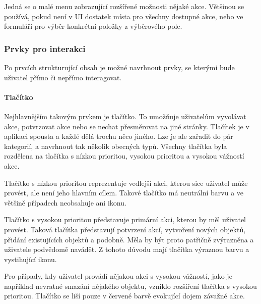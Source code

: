 			Jedná se o malé menu zobrazující rozšířené možnosti nějaké akce.
			Většinou se používá, pokud není v \ac{UI} dostatek
			místa pro všechny dostupné akce, nebo ve formuláři pro výběr konkrétní položky z výběrového pole.


		\subsubsection{Prvky pro interakci}

		Po prvcích strukturující obsah je možné navrhnout prvky, se kterými bude uživatel přímo či nepřímo interagovat.

			\paragraph{Tlačítko}

			Nejhlavnějším takovým prvkem je tlačítko.
			To umožňuje uživatelům vyvolávat akce, potvrzovat akce nebo se nechat přesměrovat na jiné stránky.
			Tlačítek je v aplikaci spousta a každé dělá trochu něco jiného.
			Lze je ale zařadit do pár kategorií, a navrhnout tak několik obecných typů.
			Všechny tlačítka byla rozdělena na tlačítka s nízkou prioritou, vysokou prioritou a vysokou vážností akce.

			Tlačítko s nízkou prioritou reprezentuje vedlejší akci, kterou sice uživatel může provést, ale není jeho hlavním cílem.
			Takové tlačítko má neutrální barvu a ve většině případech neobsahuje ani ikonu.


			Tlačítko s vysokou prioritou představuje primární akci, kterou by měl uživatel provést.
			Taková tlačítka představují potvrzení akcí, vytvoření nových objektů, přidání existujících objektů a
			podobně.
			Měla by být proto patřičně zvýrazněna a uživatele podvědomě navádět.
			Z tohoto důvodu mají tlačítka výraznou barvu a vystihující ikonu.


			Pro případy, kdy uživatel provádí nějakou akci s vysokou vážností, jako je například nevratné smazání nějakého
			objektu, vzniklo rozšíření tlačítka s vysokou prioritou.
			Tlačítko se liší pouze v červené barvě evokující dojem závažné akce.


